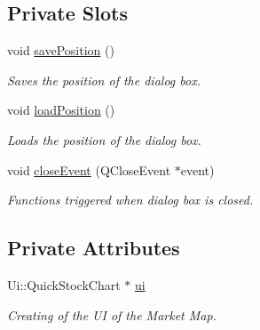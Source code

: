 \subsection*{Private Slots}
\begin{DoxyCompactItemize}
\item 
\hypertarget{class_quick_stock_chart_af99b1a624e729e2328350f38968aa1e1}{void \hyperlink{class_quick_stock_chart_af99b1a624e729e2328350f38968aa1e1}{save\+Position} ()}\label{class_quick_stock_chart_af99b1a624e729e2328350f38968aa1e1}

\begin{DoxyCompactList}\small\item\em Saves the position of the dialog box. \end{DoxyCompactList}\item 
\hypertarget{class_quick_stock_chart_ac9e5329aad2b5bce87fa46d05da331ef}{void \hyperlink{class_quick_stock_chart_ac9e5329aad2b5bce87fa46d05da331ef}{load\+Position} ()}\label{class_quick_stock_chart_ac9e5329aad2b5bce87fa46d05da331ef}

\begin{DoxyCompactList}\small\item\em Loads the position of the dialog box. \end{DoxyCompactList}\item 
\hypertarget{class_quick_stock_chart_a764cae6c7bcd52ee0d7fe42dd4b33929}{void \hyperlink{class_quick_stock_chart_a764cae6c7bcd52ee0d7fe42dd4b33929}{close\+Event} (Q\+Close\+Event $\ast$event)}\label{class_quick_stock_chart_a764cae6c7bcd52ee0d7fe42dd4b33929}

\begin{DoxyCompactList}\small\item\em Functions triggered when dialog box is closed. \end{DoxyCompactList}\end{DoxyCompactItemize}
\subsection*{Private Attributes}
\begin{DoxyCompactItemize}
\item 
\hypertarget{class_quick_stock_chart_aff762155d7d6c38f87c0fd0ff6733842}{Ui\+::\+Quick\+Stock\+Chart $\ast$ \hyperlink{class_quick_stock_chart_aff762155d7d6c38f87c0fd0ff6733842}{ui}}\label{class_quick_stock_chart_aff762155d7d6c38f87c0fd0ff6733842}

\begin{DoxyCompactList}\small\item\em Creating of the U\+I of the Market Map. \end{DoxyCompactList}\end{DoxyCompactItemize}


